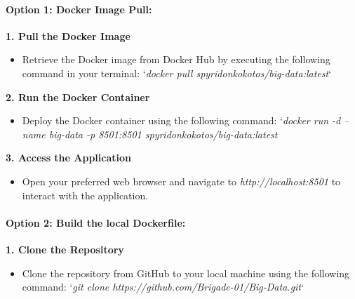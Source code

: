 \documentclass[unnumsec,webpdf,contemporary,large]{oup-authoring-template}%
\theoremstyle{thmstyleone}%
\theoremstyle{thmstyletwo}%
\theoremstyle{thmstylethree}%
\begin{document}
\paragraph{\textbf{Option 1}: Docker Image Pull:}
\vspace{0.2cm}

\textbf{1. Pull the Docker Image}
\vspace{0.2cm}

\begin{itemize}
    \item Retrieve the Docker image from Docker Hub by executing the following command in your terminal: `\textit{docker pull spyridonkokotos/big-data:latest}`
\end{itemize}
\vspace{0.2cm}

\textbf{2. Run the Docker Container}
\vspace{0.2cm}

\begin{itemize}
    \item Deploy the Docker container using the following command: `\textit{docker run -d --name big-data -p 8501:8501 spyridonkokotos/big-data:latest}
\end{itemize}
\vspace{0.2cm}

\textbf{3. Access the Application}
\vspace{0.2cm}

\begin{itemize}
    \item Open your preferred web browser and navigate to \textit{http://localhost:8501} to interact with the application.
\end{itemize}
\vspace{0.2cm}

\paragraph{\textbf{Option 2}: Build the local Dockerfile:}
\vspace{0.2cm}

\textbf{1. Clone the Repository}
\vspace{0.2cm}

\begin{itemize}
    \item Clone the repository from GitHub to your local machine using the following command: `\textit{git clone https://github.com/Brigade-01/Big-Data.git}`
\end{itemize}
\vspace{0.2cm}
\end{document}
